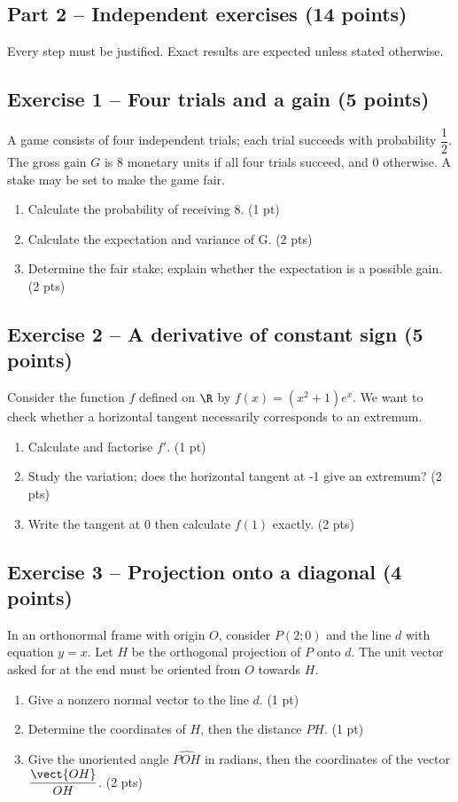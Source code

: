 \clearpage\subsection*{Part 2 -- Independent exercises (14 points)}
Every step must be justified. Exact results are expected unless stated otherwise.
\subsection*{Exercise 1 -- Four trials and a gain (5 points)}
A game consists of four independent trials; each trial succeeds with probability $\dfrac12$. The gross gain $G$ is 8 monetary units if all four trials succeed, and 0 otherwise. A stake may be set to make the game fair.
\begin{enumerate}
\item Calculate the probability of receiving 8. \hfill(1 pt)
\item Calculate the expectation and variance of G. \hfill(2 pts)
\item Determine the fair stake; explain whether the expectation is a possible gain. \hfill(2 pts)
\end{enumerate}
\subsection*{Exercise 2 -- A derivative of constant sign (5 points)}
Consider the function $f$ defined on $\R$ by $f(x)=(x^2+1)e^x$. We want to check whether a horizontal tangent necessarily corresponds to an extremum.
\begin{enumerate}
\item Calculate and factorise $f\prime$. \hfill(1 pt)
\item Study the variation; does the horizontal tangent at -1 give an extremum? \hfill(2 pts)
\item Write the tangent at 0 then calculate $f(1)$ exactly. \hfill(2 pts)
\end{enumerate}
\subsection*{Exercise 3 -- Projection onto a diagonal (4 points)}
In an orthonormal frame with origin $O$, consider $P(2;0)$ and the line $d$ with equation $y=x$. Let $H$ be the orthogonal projection of $P$ onto $d$. The unit vector asked for at the end must be oriented from $O$ towards $H$.
\begin{enumerate}
\item Give a nonzero normal vector to the line $d$. \hfill(1 pt)
\item Determine the coordinates of $H$, then the distance $PH$. \hfill(1 pt)
\item Give the unoriented angle $\widehat{POH}$ in radians, then the coordinates of the vector $\dfrac{\vect{OH}}{OH}$. \hfill(2 pts)
\end{enumerate}
